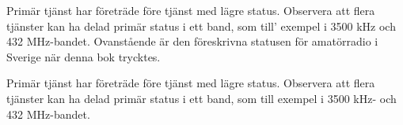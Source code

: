 Primär tjänst har företräde före tjänst med lägre status.
Observera att flera tjänster kan ha delad primär status i ett band, som till'
exempel i 3500 kHz och 432 MHz-bandet.
Ovanstående är den föreskrivna statusen för amatörradio i Sverige när
denna bok trycktes.

Primär tjänst har företräde före tjänst med lägre status.
Observera att flera tjänster kan ha delad primär status i ett band,
som till exempel i 3500 kHz- och 432 MHz-bandet.


